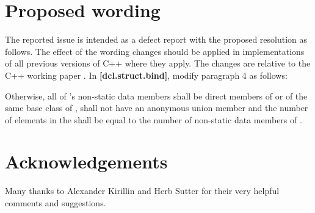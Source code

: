 \section{Proposed wording}

The reported issue is intended as a defect report with the proposed resolution as follows. The effect of the wording changes should be applied in implementations of all previous versions of C++ where they apply. The changes are relative to the C++ working paper \cite{Smith2018}. In \textbf{[dcl.struct.bind]}, modify paragraph 4 as follows:

\begin{adjustwidth}{1cm}{1cm}
Otherwise, all of 's non-static data members shall be direct
members of  or of the same base class of ,  shall not have an anonymous union member\removed{,}\added{;} and the number of elements in the  shall be equal to the number of non-static data members of .
\end{adjustwidth}



\section*{Acknowledgements}

Many thanks to Alexander Kirillin and Herb Sutter for their very helpful comments and suggestions.

\renewcommand{\bibname}{References}




